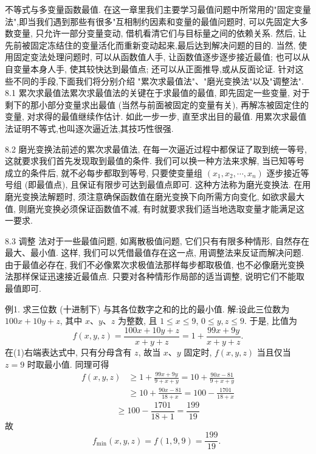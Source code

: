 
不等式与多变量函数最值.
在这一章里我们主要学习最值问题中所常用的"固定变量法",即当我们遇到那些有很多"互相制约因素和变量的最值问题时, 可以先固定大多数变量, 只允许一部分变量变动, 借机看清它们与目标量之间的依赖关系.
然后, 让先前被固定冻结住的变量活化而重新变动起来,最后达到解决问题的目的.
当然, 使用固定变法处理问题时, 可以从函数值人手, 让函数值逐步逐步接近最值; 也可以从自变量本身人手, 使其较快达到最值点; 还可以从正面推导,或从反面论证.
针对这些不同的手段,下面我们将分别介绍 "累次求最值法"、"磨光变换法"以及"调整法".
8.1 累次求最值法累次求最值法的关键在于求最值的最值, 即先固定一些变量, 对于剩下的那小部分变量求出最值 (当然与前面被固定的变量有关), 再解冻被固定住的变量, 对求得的最值继续作估计.
如此一步一步, 直至求出目的最值.
用累次求最值法证明不等式,也叫逐次逼近法,其技巧性很强.



8.2 磨光变换法前述的累次求最值法, 在每一次逼近过程中都保证了取到统一等号, 这就要求我们首先发现取到最值的条件.
我们可以换一种方法来求解, 当已知等号成立的条件后, 就不必每步都取到等号, 只要使变量组 $\left(x_1, x_2, \cdots, x_n\right)$ 逐步接近等号组 (即最值点), 且保证有限步可达到最值点即可.
这种方法称为磨光变换法.
在用磨光变换法解题时, 须注意确保函数值在磨光变换下向所需方向变化, 如欲求最大值, 则磨光变换必须保证函数值不减, 有时就要求我们适当地选取变量才能满足这一要求.



8.3 调整 法对于一些最值问题, 如离散极值问题, 它们只有有限多种情形, 自然存在最大、最小值.
这样, 我们可以凭借最值存在这一点, 用调整法来反证而解决问题.
由于最值必存在, 我们不必像累次求极值法那样每步都取极值, 也不必像磨光变换法那样保证迅速接近最值点.
只要对各种情形作局部的适当调整, 说明它们不能取最值即可.



例1. 求三位数 (十进制下) 与其各位数字之和的比的最小值.
解:设此三位数为 $100 x+10 y+z$, 其中 $x 、 y 、 z$ 为整数, 且 $1 \leqslant x \leqslant 9$, $0 \leqslant y, z \leqslant 9$. 于是, 比值为
$$
f(x, y, z)=\frac{100 x+10 y+z}{x+y+z}=1+\frac{99 x+9 y}{x+y+z} . \label{(1)}
$$
在(1)右端表达式中, 只有分母含有 $z$, 故当 $x 、 y$ 固定时, $f(x, y, z)$ 当且仅当 $z=9$ 时取最小值.
同理可得
$$
\begin{aligned}
f(x, y, z) & \geqslant 1+\frac{99 x+9 y}{9+x+y}=10+\frac{90 x-81}{9+x+y} \\
& \geqslant 10+\frac{90 x-81}{18+x}=100-\frac{1701}{18+x}
\end{aligned}
$$
$$
\geqslant 100-\frac{1701}{18+1}=\frac{199}{19}
$$
故
$$
f_{\min }(x, y, z)=f(1,9,9)=\frac{199}{19} \text {. }
$$



